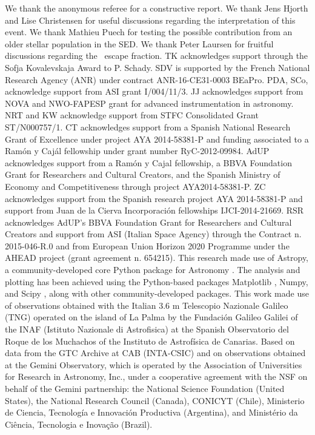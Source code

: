 \documentclass[referee]{aa}
\begin{document}
\begin{acknowledgements}
We thank the anonymous referee for a constructive report. 
%
We thank Jens Hjorth and Lise Christensen for useful discussions regarding the interpretation of this event. We thank Mathieu Puech for testing the possible contribution from an older stellar population in the SED. We thank Peter Laursen for fruitful discussions regarding the \lya~escape fraction.
%	
TK acknowledges support through the Sofja Kovalevskaja Award to P. Schady.
%
SDV is supported by the French National Research Agency (ANR) under contract ANR-16-CE31-0003 BEaPro.
%
PDA, SCo, acknowledge support from ASI grant I/004/11/3.
%
JJ acknowledges support from NOVA and NWO-FAPESP grant for advanced
instrumentation in astronomy.
%
NRT and KW acknowledge support from STFC Consolidated
Grant ST/N000757/1.
%
CT acknowledges support from a Spanish National Research Grant of Excellence
under project AYA 2014-58381-P and funding associated to a Ramón y Cajál
fellowship under grant number RyC-2012-09984.
%
AdUP acknowledges support from a Ramón y Cajal fellowship, a BBVA Foundation
Grant for Researchers and Cultural Creators, and the Spanish Ministry of Economy
and Competitiveness through project AYA2014-58381-P.
%
ZC acknowledges support from the Spanish research project AYA 2014-58381-P and
support from Juan de la Cierva Incorporaci\'on fellowships IJCI-2014-21669.
%
RSR acknowledges AdUP's BBVA Foundation Grant for Researchers and Cultural
Creators and support from ASI (Italian Space Agency) through the Contract n. 2015-046-R.0 and from European Union Horizon 2020 Programme under the AHEAD project (grant agreement n. 654215).
%
This research made use of Astropy, a community-developed core Python package for Astronomy \citep{TheAstropyCollaboration2013}. The analysis and plotting has been achieved using the Python-based packages Matplotlib \citep{Hunter2007}, Numpy, and Scipy \citep{VanderWalt2011}, along with other community-developed packages.
%
This work made use of observations obtained with the Italian 3.6 m Telescopio Nazionale Galileo (TNG) operated on the island of La Palma by the Fundaci\'on Galileo Galilei of the INAF (Istituto Nazionale di Astrofisica) at the Spanish Observatorio del Roque de los Muchachos of the Instituto de Astrof\'isica de Canarias.
%
Based on data from the GTC Archive at CAB (INTA-CSIC) and on observations obtained at the Gemini Observatory, which is operated by the Association of Universities for Research in Astronomy, Inc., under a cooperative agreement with the NSF on behalf of the Gemini partnership: the National Science Foundation (United States), the National Research Council (Canada), CONICYT (Chile), Ministerio de Ciencia, Tecnología e Innovación Productiva (Argentina), and Ministério da Ciência, Tecnologia e Inovação (Brazil).

\end{acknowledgements}



\end{document}
